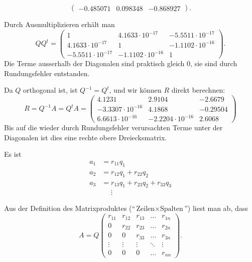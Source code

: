\begin{loesung}
\begin{teilaufgaben}
\[\begin{pmatrix}
  -0.485071&  0.098348& -0.868927
\end{pmatrix}.
\]
\item
Durch Ausmultiplizieren erhält man
\[
QQ^t
=
\begin{pmatrix}
   1                  &  4.1633\cdot10^{-17}&-5.5511\cdot10^{-17}\\
   4.1633\cdot10^{-17}&  1                  &-1.1102\cdot10^{-16}\\
  -5.5511\cdot10^{-17}& -1.1102\cdot10^{-16}&  1
\end{pmatrix}.
\]
Die Terme ausserhalb der Diagonalen sind praktisch gleich $0$, sie
sind durch Rundungsfehler entstanden.
\item
Da $Q$ orthogonal ist, ist $Q^{-1}=Q^t$, und wir können $R$ direkt
berechnen:
\[
R=Q^{-1}A=Q^tA=
\begin{pmatrix}
   4.1231             & 2.9104             &-2.6679    \\
  -3.3307\cdot10^{-16}& 4.1868             &-0.29504   \\
   6.6613\cdot10^{-16}&-2.2204\cdot10^{-16}& 2.6068
\end{pmatrix}
\]
Bis auf die wieder durch Rundungsfehler verursachten Terme unter der
Diagonalen ist dies eine rechte obere Dreiecksmatrix.
\item
Es ist
\begin{align*}
a_1 &= r_{11} q_1 \\
a_2 &= r_{12} q_1 + r_{22} q_2 \\
a_3 &= r_{13} q_1 + r_{23} q_2 + r _{33} q_3 \\
    &\phantom{=}\vdots
\end{align*}
\item
Aus der Definition des Matrixproduktes (``$\text{Zeilen}\times\text{Spalten}$'')
liest man ab, dass 
\[
A=Q\begin{pmatrix}
r_{11}&r_{12}&r_{13}&\dots &r_{1n}\\
     0&r_{22}&r_{23}&\dots &r_{2n}\\
     0&     0&r_{33}&\dots &r_{3n}\\
\vdots&\vdots&\vdots&\ddots&\vdots\\
     0&     0&     0&\dots &r_{nn}
\end{pmatrix}.
\]
\end{teilaufgaben}
\end{loesung}

